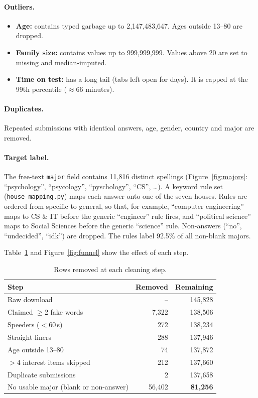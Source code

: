 \documentclass[11pt,a4paper]{article}
\begin{document}
\paragraph{Outliers.}
\begin{itemize}
\item \textbf{Age:} contains typed garbage up to 2,147,483,647. Ages outside 13--80 are dropped.
\item \textbf{Family size:} contains values up to 999,999,999. Values above 20 are set to missing
      and median-imputed.
\item \textbf{Time on test:} has a long tail (tabs left open for days). It is capped at the 99th
      percentile ($\approx$66 minutes).
\end{itemize}

\paragraph{Duplicates.} Repeated submissions with identical answers, age, gender, country and major
are removed.

\paragraph{Target label.} The free-text \texttt{major} field contains 11,816 distinct spellings
(Figure~\ref{fig:majors}: ``psychology'', ``psycology'', ``pyschology'', ``CS'', \ldots). A keyword
rule set (\texttt{house\_mapping.py}) maps each answer onto one of the seven houses. Rules are
ordered from specific to general, so that, for example, ``computer engineering'' maps to CS \& IT
before the generic ``engineer'' rule fires, and ``political science'' maps to Social Sciences
before the generic ``science'' rule. Non-answers (``no'', ``undecided'', ``idk'') are dropped. The
rules label 92.5\% of all non-blank majors.

Table~\ref{tab:funnel} and Figure~\ref{fig:funnel} show the effect of each step.

\begin{table}[H]
\centering\small
\caption{Rows removed at each cleaning step.}
\label{tab:funnel}
\begin{tabular}{@{}lrr@{}}
\toprule
Step & Removed & Remaining \\
\midrule
Raw download & -- & 145,828 \\
Claimed $\geq$2 fake words & 7,322 & 138,506 \\
Speeders ($<$60\,s) & 272 & 138,234 \\
Straight-liners & 288 & 137,946 \\
Age outside 13--80 & 74 & 137,872 \\
$>$4 interest items skipped & 212 & 137,660 \\
Duplicate submissions & 2 & 137,658 \\
No usable major (blank or non-answer) & 56,402 & \textbf{81,256} \\
\bottomrule
\end{tabular}
\end{table}
\end{document}
